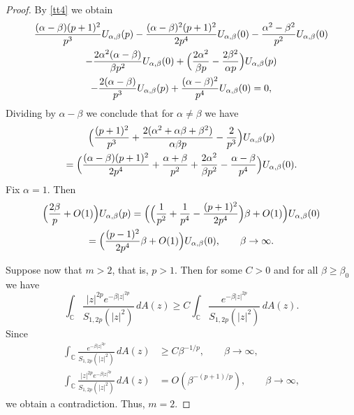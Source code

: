 \documentclass[10pt,a4paper]{amsart}
\begin{document}
\begin{proof}
By \eqref{tt4} we obtain
\begin{multline*}
\frac{(\alpha-\beta)(p+1)^2}{p^3} U_{\alpha,\beta}(p)-\frac{(\alpha-\beta)^2(p+1)^2}{2p^4}U_{\alpha,\beta}(0)- \frac{\alpha^2-\beta^2}{p^2}U_{\alpha,\beta}(0)\\
-\frac{2\alpha^2(\alpha-\beta)}{\beta p^2}U_{\alpha,\beta}(0)+\Bigl(\frac{2\alpha^2}{\beta p}
-\frac{2\beta^2}{\alpha p}\Bigr)U_{\alpha,\beta}(p)
\\-\frac{2(\alpha-\beta)}{p^3}U_{\alpha,\beta}(p)+\frac{(\alpha-\beta)^2}{p^4}U_{\alpha,\beta}(0)=0,
\end{multline*}
Dividing by $\alpha-\beta$ we conclude that for $\alpha\not=\beta$ we have 
\begin{multline*}
\Bigl(\frac{(p+1)^2}{p^3} +\frac{2(\alpha^2+\alpha\beta+\beta^2)}{\alpha\beta p}-\frac{2}{p^3}\Bigr)U_{\alpha,\beta}(p) 
\\ =\Bigl(\frac{(\alpha-\beta)(p+1)^2}{2p^4}+\frac{\alpha+\beta}{p^2}+\frac{2\alpha^2}{\beta p^2}-\frac{\alpha-\beta}{p^4}\Bigr)U_{\alpha,\beta}(0).
\end{multline*}
Fix $\alpha=1$. Then
\begin{multline*}
\Bigl(\frac{2\beta}{p}+O(1)\Bigr)U_{\alpha,\beta}(p)  =\Bigl(\Bigl(\frac{1}{p^2}+\frac{1}{p^4}-\frac{(p+1)^2}{2p^4}\Bigr)\beta+O(1)\Bigr)U_{\alpha,\beta}(0)\\=
\Bigl(\frac{(p-1)^2}{2p^4}\beta+O(1)\Bigr)U_{\alpha,\beta}(0),\qquad \beta\to\infty.
\end{multline*}

Suppose now that $m>2$, that is, $p>1$. Then for some $C>0$ and for all $\beta\ge \beta_0$ we have 
$$
\int_{\mathbb C}  \frac{  |z|^{2p} e^{-  \beta |z|^{2p}}  }{ S_{1,2p}(|z|^2)}\,dA(z)\ge C \int_{\mathbb C}  \frac{e^{-  \beta |z|^{2p}}  }{ S_{1,2p}(|z|^2)}\,dA(z).
$$
Since
\begin{align*}
\int_{\mathbb C}  \frac{e^{-  \beta |z|^{2p}}  }{ S_{1,2p}(|z|^2)}\,dA(z)&\ge C\beta^{-1/p},\qquad \beta\to\infty,\\
\int_{\mathbb C}  \frac{|z|^{2p} e^{-  \beta |z|^{2p}}  }{ S_{1,2p}(|z|^2)}\,dA(z)&=O(\beta^{-(p+1)/p}),\qquad \beta\to\infty,
\end{align*}
we obtain a contradiction. Thus, $m=2$. 
\end{proof}
\end{document}

